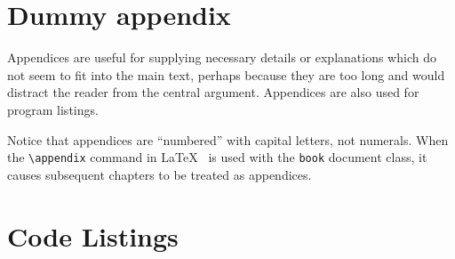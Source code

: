 \documentclass[12pt,openany,a4paper]{book}
\begin{document}
\chapter{Dummy appendix}

Appendices are useful for supplying necessary details or explanations
which do not seem to fit into the main text, perhaps because they are
too long and would distract the reader from the central argument.
Appendices are also used for program listings.

Notice that appendices are ``numbered'' with capital letters, not
numerals.  When the \verb+\appendix+ command in
\LaTeX~\cite[p.\,175]{lamport} is used with the \texttt{book} document
class, it causes subsequent chapters to be treated as appendices.

\chapter{Code Listings}
\end{document}
